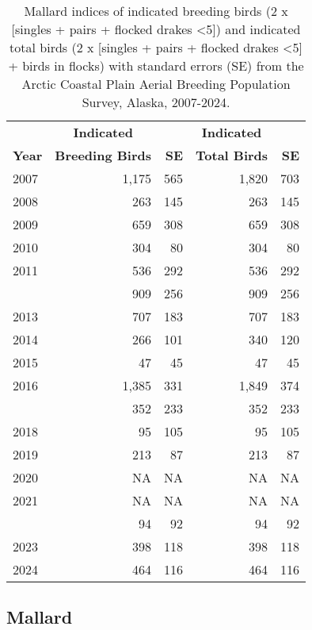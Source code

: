 \documentclass[
]{article}
\begin{document}
\begin{longtable}[t]{lrrrr}

\caption{\label{tbl-MALL}Mallard indices of indicated breeding birds (2
x {[}singles + pairs + flocked drakes \textless5{]}) and indicated total
birds (2 x {[}singles + pairs + flocked drakes \textless5{]} + birds in
flocks) with standard errors (SE) from the Arctic Coastal Plain Aerial
Breeding Population Survey, Alaska, 2007-2024.}

\tabularnewline

\\
\toprule
\multicolumn{1}{c}{\textbf{ }} & \multicolumn{1}{c}{\textbf{Indicated}} & \multicolumn{1}{c}{\textbf{ }} & \multicolumn{1}{c}{\textbf{Indicated}} & \multicolumn{1}{c}{\textbf{ }} \\
\cmidrule(l{3pt}r{3pt}){2-2} \cmidrule(l{3pt}r{3pt}){4-4}
\textbf{Year} & \textbf{Breeding Birds} & \textbf{SE} & \textbf{Total Birds} & \textbf{SE}\\
\midrule
2007 & 1,175 & 565 & 1,820 & 703\\
2008 & 263 & 145 & 263 & 145\\
2009 & 659 & 308 & 659 & 308\\
2010 & 304 & 80 & 304 & 80\\
2011 & 536 & 292 & 536 & 292\\
\addlinespace
2012 & 909 & 256 & 909 & 256\\
2013 & 707 & 183 & 707 & 183\\
2014 & 266 & 101 & 340 & 120\\
2015 & 47 & 45 & 47 & 45\\
2016 & 1,385 & 331 & 1,849 & 374\\
\addlinespace
2017 & 352 & 233 & 352 & 233\\
2018 & 95 & 105 & 95 & 105\\
2019 & 213 & 87 & 213 & 87\\
2020 & NA & NA & NA & NA\\
2021 & NA & NA & NA & NA\\
\addlinespace
2022 & 94 & 92 & 94 & 92\\
2023 & 398 & 118 & 398 & 118\\
2024 & 464 & 116 & 464 & 116\\
\bottomrule

\end{longtable}

\endgroup{}

\newpage{}

\subsection*{Mallard}\label{mallard-2}
\end{document}
